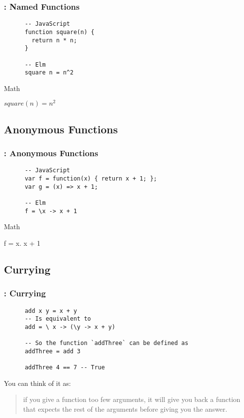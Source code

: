 \documentclass{beamer}
\begin{document}
\frame %

\begin{frame}[fragile]
  \frametitle{\insertsection: Named Functions}
\begin{lstlisting}
      -- JavaScript
      function square(n) {
        return n * n;
      }

      -- Elm
      square n = n^2
\end{lstlisting}

  \pause
  Math

  $square(n) = n^2$
\end{frame}

\subsection{Anonymous Functions}

\begin{frame}[fragile]
  \frametitle{\insertsection: Anonymous Functions}
\begin{lstlisting}
      -- JavaScript
      var f = function(x) { return x + 1; };
      var g = (x) => x + 1;

      -- Elm
      f = \x -> x + 1
\end{lstlisting}

  Math

  f = \lambda x. x + 1

\end{frame}

\subsection{Currying}

\begin{frame}[fragile]
  \frametitle{\insertsection: Currying}

    \begin{lstlisting}
      add x y = x + y
      -- Is equivalent to
      add = \ x -> (\y -> x + y)

      -- So the function `addThree` can be defined as
      addThree = add 3

      addThree 4 == 7 -- True
    \end{lstlisting}


    \pause

    You can think of it as:

    \begin{quote}
      if you give a function too few arguments, it will give you back a function
      that expects the rest of the arguments before giving you the answer.
    \end{quote}
\end{frame}
\end{document}
